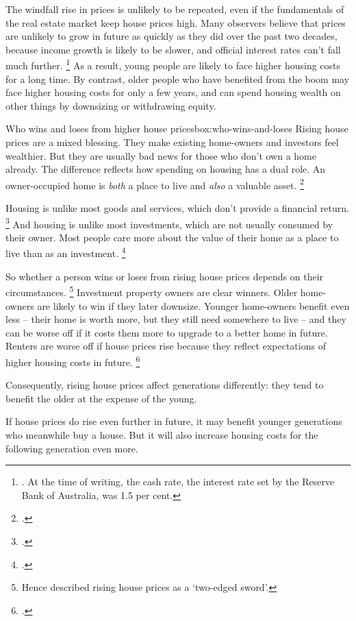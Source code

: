 The windfall rise in prices is unlikely to be repeated, even if the fundamentals of the real estate market keep house prices high.
Many observers believe that prices are unlikely to grow in future as quickly as they did over the past two decades, because income growth is likely to be slower, and official interest rates can't fall much further.%
	\footnote{\textcites{Eslake-why-housing-expensive}{FoxTulip2014overvalued}{CoreLogic2017}[][31]{DaleyWoodWeidmannHarrison-2014-Wealth-of-generations}.
	At the time of writing, the cash rate, the interest rate set by the Reserve Bank of Australia, was 1.5 per cent.}
As a result, young people are likely to face higher housing costs for a long time.
By contrast, older people who have benefited from the boom may face higher housing costs for only a few years, and can spend housing wealth on other things by downsizing or withdrawing equity.


\begin{smallbox}{Who wins and loses from higher house prices}{box:who-wins-and-loses}
Rising house prices are a mixed blessing. They make existing home-owners and investors feel wealthier. But they are usually bad news for those who don't own a home already. The difference reflects how spending on housing has a dual role.
An owner-occupied home is \emph{both} a place to live and \emph{also} a valuable asset.%
	\footcite{Freebairn2016Housing} 

Housing is unlike most goods and services, which don't provide a financial return.%
	\footcite{FlavinYamashita2002Housing}
And housing is unlike most investments, which are not usually consumed by their owner.
Most people care more about the value of their home as a place to live than as an investment.%
	\footcite{IoannidesRosenthal1994Housing}

So whether a person wins or loses from rising house prices depends on their circumstances.%
    \footnote{Hence \textcite{Lowe2017Householddebt} described rising house prices as a `two-edged sword'.}
Investment property owners are clear winners.
Older home-owners are likely to win if they later downsize.
Younger home-owners benefit even less – their home is worth more, but they still need somewhere to live – and they can be worse off if it costs them more to upgrade to a better home in future.
Renters are worse off if house prices rise because they reflect expectations of higher housing costs in future.%
	\footcite{Lowe-national-balance-sheet-speech}

Consequently, rising house prices affect generations differently: they tend to benefit the older at the expense of the young. 

If house prices do rise even further in future, it may benefit younger generations who meanwhile buy a house. But it will also increase housing costs for the following generation even more. 

\end{smallbox}



